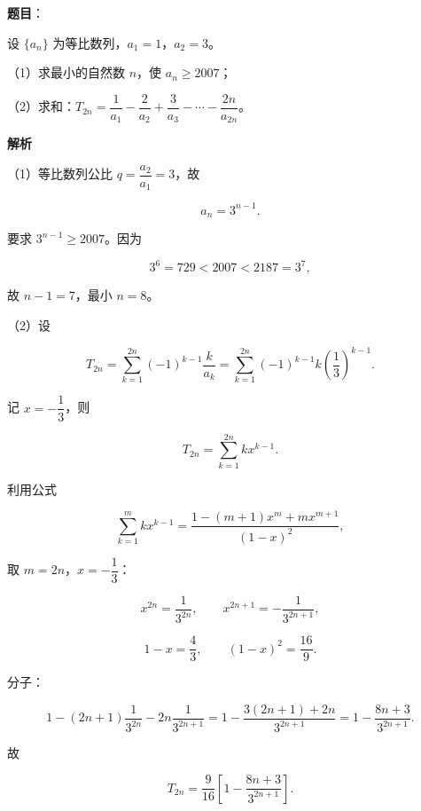 \begin{answer}

\textbf{题目}：

设 $\{a_n\}$ 为等比数列，$a_1=1$，$a_2=3$。

（1）求最小的自然数 $n$，使 $a_n\geqslant2007$；

（2）求和：$T_{2n}=\dfrac1{a_1}-\dfrac2{a_2}+\dfrac3{a_3}-\cdots-\dfrac{2n}{a_{2n}}$。

\textbf{解析}

（1）等比数列公比 $q=\dfrac{a_2}{a_1}=3$，故

\nopagebreak[4]
\[a_n=3^{n-1}.\]

要求 $3^{n-1}\geqslant2007$。因为

\nopagebreak[4]
\[3^6=729<2007<2187=3^7,\]

故 $n-1=7$，最小 $n=8$。

（2）设

\nopagebreak[4]
\[T_{2n}=\sum_{k=1}^{2n}(-1)^{k-1}\frac{k}{a_k}=\sum_{k=1}^{2n}(-1)^{k-1}k\left(\frac13\right)^{k-1}.\]

记 $x=-\dfrac13$，则

\nopagebreak[4]
\[T_{2n}=\sum_{k=1}^{2n}k x^{k-1}.\]

利用公式

\nopagebreak[4]
\[\sum_{k=1}^{m}k x^{k-1}=\frac{1-(m+1)x^m+m x^{m+1}}{(1-x)^2},\]

取 $m=2n$，$x=-\dfrac13$：

\nopagebreak[4]
\[x^{2n}=\frac1{3^{2n}},\qquad x^{2n+1}=-\frac1{3^{2n+1}},\]

\nopagebreak[4]
\[1-x=\frac43,\qquad (1-x)^2=\frac{16}{9}.\]

分子：

\nopagebreak[4]
\[1-(2n+1)\frac1{3^{2n}}-2n\frac1{3^{2n+1}}
=1-\frac{3(2n+1)+2n}{3^{2n+1}}
=1-\frac{8n+3}{3^{2n+1}}.\]

故

\nopagebreak[4]
\[T_{2n}=\frac{9}{16}\left[1-\frac{8n+3}{3^{2n+1}}\right].\]


\end{answer}
